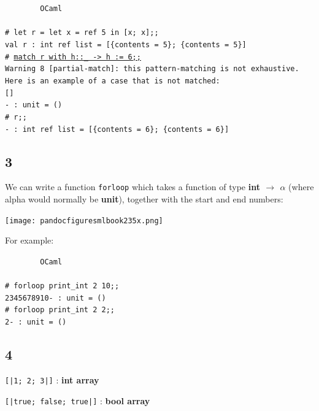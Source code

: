 \documentclass[]{book}
\newcommand{\smspace}{\vspace{4mm}}
\begin{document}
\smspace
\noindent\verb!        OCaml!\\
\noindent\\
\noindent\verb!# let r = let x = ref 5 in [x; x];;!\\
\noindent\verb!val r : int ref list = [{contents = 5}; {contents = 5}]!\\
\noindent\texttt{\# }\underline{\verb!match r with h::_ -> h := 6;;!}\\
\noindent\verb!Warning 8 [partial-match]: this pattern-matching is not exhaustive.!\\
\noindent\verb!Here is an example of a case that is not matched:!\\
\noindent\verb![]!\\
\noindent\verb!- : unit = ()!\\
\noindent\verb!# r;;!\\
\noindent\verb!- : int ref list = [{contents = 6}; {contents = 6}]!\vphantom{g}

\subsection*{3}
We can write a function \texttt{forloop} which takes a function of type \textsf{\textbf{int $\rightarrow$ $\alpha$}} (where alpha would normally be \textbf{\textsf{unit}}), together with the start and end numbers:

\medskip
\begin{center}
\noindent\texttt{[image: pandocfiguresmlbook235x.png]}
\end{center}
\medskip

\noindent For example:

\smspace
\noindent\verb!        OCaml!\\
\noindent\\
\noindent\verb!# forloop print_int 2 10;;!\\
\noindent\verb!2345678910- : unit = ()!\\
\noindent\verb!# forloop print_int 2 2;;!\\
\noindent\verb!2- : unit = ()!

\subsection*{4}

\texttt{[|1; 2; 3|]} : \textbf{\textsf{int array}}

\vspace{2mm}
\noindent \texttt{[|true; false; true|]} : \textbf{\textsf{bool array}}
\end{document}
